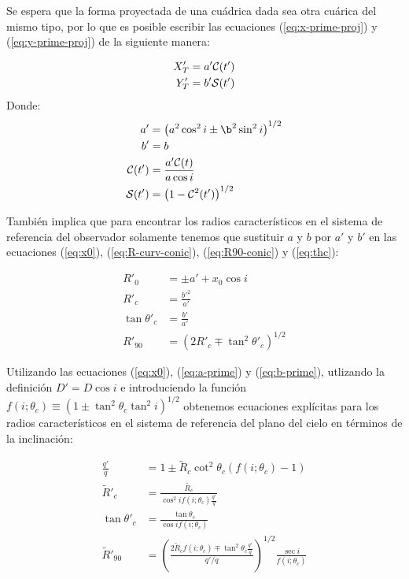 Se espera que la forma proyectada de una cuádrica dada sea otra cuárica del mismo
tipo, por lo que es posible escribir las ecuaciones (\ref{eq:x-prime-proj}) y
(\ref{eq:y-prime-proj}) de la siguiente manera: 

\begin{align}
  X'_T &= a'\mathcal{C}(t') \\
  Y'_T &= b'\mathcal{S}(t')
\end{align}
Donde:
\begin{align}
  a' &= \left(a^2\cos^2 i \pm \b^2\sin^2 i\right)^{1/2} \label{eq:a-prime}\\
  b' &= b \label{eq:b-prime}\\
  \Cos(t') &= \frac{a'\Cos(t)}{a\cos i} \\
  \Sin(t') &= \left(1 - \Cos^2(t')\right)^{1/2}
\end{align}

También implica que para encontrar los radios característicos en el sistema de
referencia del observador solamente tenemos que sustituir $a$ y $b$ por $a'$ y
$b'$ en las ecuaciones (\ref{eq:x0}), (\ref{eq:R-curv-conic}), (\ref{eq:R90-conic})
y (\ref{eq:thc}):

\begin{align}
  R'_0 &= \pm a' +x_0\cos i\\
  R'_c &= \frac{b'^2}{a'}\\
  \tan\theta'_c &= \frac{b'}{a'} \\
  R'_{90} &= \left(2R'_c \mp \tan^2\theta'_c\right)^{1/2}
\end{align}

Utilizando las ecuaciones (\ref{eq:x0}), (\ref{eq:a-prime}) y (\ref{eq:b-prime}),
utlizando la definición $D' = D\cos i$ e introduciendo la función
$f(i;\theta_c)\equiv \left(1 \pm \tan^2\theta_c\tan^2i\right)^{1/2}$ obtenemos
ecuaciones explícitas para los radios característicos en el sistema de referencia
del plano del cielo en términos de la inclinación:

\begin{align}
  \frac{q'}{q} &= 1 \pm \tilde{R}_c\cot^2\theta_c\left(f(i;\theta_c) - 1\right) \\
  \tilde{R}'_c &= \frac{\tilde{R_c}}{\cos^2if(i;\theta_c)\frac{q'}{q}} \\
  \tan\theta'_c &= \frac{\tan\theta_c}{\cos if(i;\theta_c)} \\
  \tilde{R}'_{90} &= \left(\frac{2\tilde{R}_cf(i;\theta_c) \mp
                  \tan^2\theta_c\frac{q'}{q}}{q'/q}\right)^{1/2}\frac{\sec i}{f(i;\theta_c)}
\end{align}

